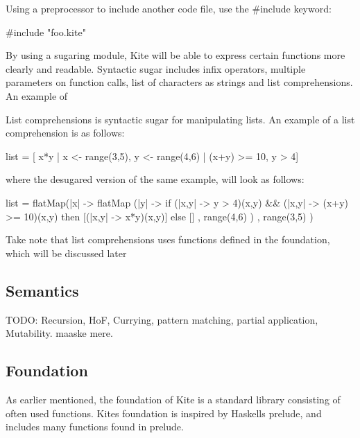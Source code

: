 Using a preprocessor to include another code file, use the \#include
keyword:
\begin{kite}
  
  #include "foo.kite"
\end{kite}

By using a sugaring module, Kite will be able to express certain
functions more clearly and readable. Syntactic sugar includes infix
operators, multiple parameters on function calls, list of characters
as strings and list comprehensions. An example of 

List comprehensions is syntactic sugar for manipulating
lists. An example of a list comprehension is as follows:
\begin{kite}
  
  list = [ x*y | x <- range(3,5), y <- range(4,6) | (x+y) >= 10, y > 4]
\end{kite}
where the desugared version of the same example, will look as follows:
\begin{kite}

  list =
  flatMap(|x| -> {
    flatMap (|y| -> {
      if (|x,y| -> {y > 4})(x,y) && (|x,y| -> {(x+y) >= 10})(x,y) 
         then [(|x,y| -> {x*y})(x,y)] 
         else []
    } , range(4,6) )
}, range(3,5) )
\end{kite}
Take note that list comprehensions uses functions defined in the
foundation, which will be discussed later
\subsection{Semantics}

TODO: Recursion, HoF, Currying, pattern matching,
partial application, Mutability. maaske mere.

\subsection{Foundation}

As earlier mentioned, the foundation of Kite is a standard library
consisting of often used functions. Kites foundation is inspired by
Haskells prelude, and includes many functions found in prelude.

